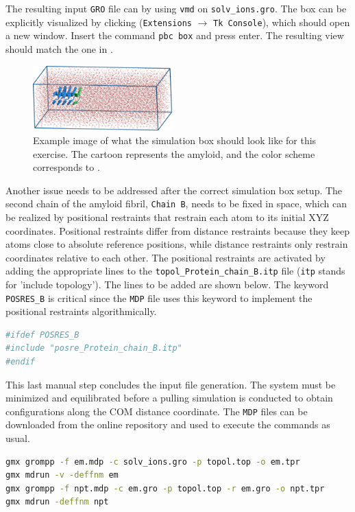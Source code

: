 \documentclass[9pt,tutorial]{livecoms}
\newcommand{\code}[1]{\colorbox{light-gray}{\texttt{#1}}}
\begin{document}
The resulting input \texttt{GRO} file can by using \code{vmd} on \code{solv\_ions.gro}. The box can be explicitly visualized by clicking (\code{Extensions} $\to$ \code{Tk Console}), which should open a new window. Insert the command \code{pbc box} and press enter. The resulting view should match the one in .
\begin{figure}[H]
   \centering
   \includegraphics[width=0.48\textwidth]{figures/simbox.png}
   \caption{Example image of what the simulation box should look like for this exercise. The cartoon represents the amyloid, and the color scheme corresponds to .}
   \label{fig:simbox}
\end{figure}
Another issue needs to be addressed after the correct simulation box setup. The second chain of the amyloid fibril, \texttt{Chain B}, needs to be fixed in space, which can be realized by positional restraints that restrain each atom to its initial XYZ coordinates. Positional restraints differ from distance restraints because they keep atoms close to absolute reference positions, while distance restraints only restrain coordinates relative to each other. The positional restraints are activated by adding the appropriate lines to the \texttt{topol\_Protein\_chain\_B.itp} file (\code{itp} stands for 'include topology'). The lines to be added are shown below. The keyword \code{POSRES\_B} is critical since the \texttt{MDP} file uses this keyword to implement the positional restraints algorithmically.
\begin{lstlisting}[language=bash]
#ifdef POSRES_B
#include "posre_Protein_chain_B.itp"
#endif
\end{lstlisting}
This last manual step concludes the input file generation. The system must be minimized and equilibrated before a pulling simulation is conducted to obtain configurations along the COM distance coordinate. The \texttt{MDP} files can be downloaded from the online repository and used to execute the commands as usual.
\begin{lstlisting}[language=bash]
gmx grompp -f em.mdp -c solv_ions.gro -p topol.top -o em.tpr
gmx mdrun -v -deffnm em
gmx grompp -f npt.mdp -c em.gro -p topol.top -r em.gro -o npt.tpr
gmx mdrun -deffnm npt
\end{lstlisting}
\end{document}
